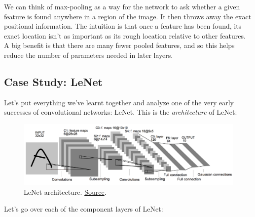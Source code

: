 \documentclass[a4paper]{tufte-handout}
\begin{document}
We can think of max-pooling as a way for the network to ask whether a
given feature is found anywhere in a region of the image. It then throws
away the exact positional information. The intuition is that once a
feature has been found, its exact location isn't as important as its
rough location relative to other features. A big benefit is that there
are many fewer pooled features, and so this helps reduce the number of
parameters needed in later layers.

\subsection{Case Study: LeNet}\label{case-study-lenet}

Let's put everything we've learnt together and analyze one of the very
early successes  of convolutional networks: LeNet. This
is the \emph{architecture} of LeNet:

\begin{figure}
\includegraphics[width=\linewidth]{lenet.png}
\caption{LeNet architecture.
\href{http://yann.lecun.com/exdb/publis/pdf/lecun-01a.pdf}{Source}. }
\end{figure}

Let's go over each of the component layers of LeNet:
\end{document}
